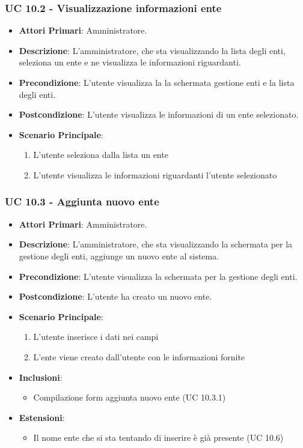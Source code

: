 			\subsubsection{UC 10.2 - Visualizzazione informazioni ente}
			\begin{itemize}
				\item \textbf{Attori Primari}: Amministratore.
				\item \textbf{Descrizione}: L'amministratore, che sta visualizzando la lista degli enti, seleziona un ente e ne visualizza le informazioni riguardanti.
				\item \textbf{Precondizione}: L'utente visualizza la la schermata gestione enti e la lista degli enti.
				\item \textbf{Postcondizione}: L'utente visualizza le informazioni di un ente selezionato.
				\item \textbf{Scenario Principale}:
				\begin{enumerate}
					\item{L'utente seleziona dalla lista un ente}
					\item{L'utente visualizza le informazioni riguardanti l'utente selezionato}
				\end{enumerate}	
			\end{itemize}

			\subsubsection{UC 10.3 - Aggiunta nuovo ente}
			\begin{itemize}
				\item \textbf{Attori Primari}: Amministratore.
				\item \textbf{Descrizione}: L'amministratore, che sta visualizzando la schermata per la gestione degli enti, aggiunge un nuovo ente al sistema.
				\item \textbf{Precondizione}: L'utente visualizza la schermata per la gestione degli enti.
				\item \textbf{Postcondizione}: L'utente ha creato un nuovo ente.
				\item \textbf{Scenario Principale}:
				\begin{enumerate}
					\item{L'utente inserisce i dati nei campi}
					\item{L'ente viene creato dall'utente con le informazioni fornite}
				\end{enumerate}	
				\item \textbf{Inclusioni}:
					\begin{itemize}
						\item Compilazione form aggiunta nuovo ente (UC 10.3.1)
					\end{itemize}
				\item \textbf{Estensioni}:
					\begin{itemize}
						\item Il nome ente che si sta tentando di inserire è già presente (UC 10.6)
					\end{itemize}
			\end{itemize}	

